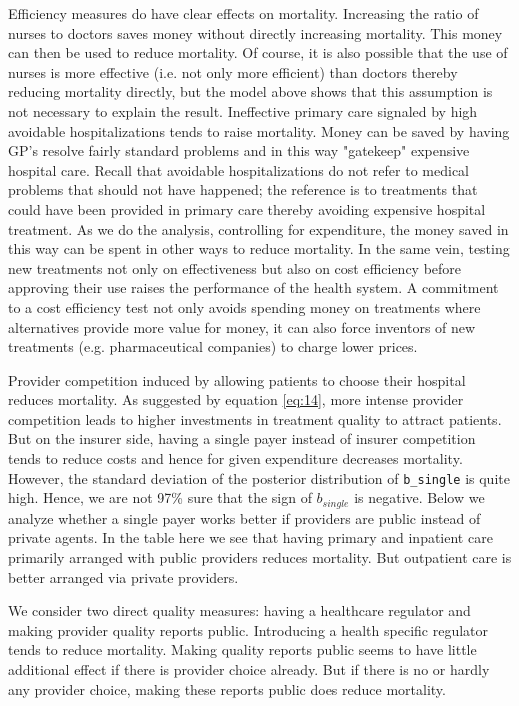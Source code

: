 \documentclass[12pt,english,a4paper]{article}
\begin{document}
Efficiency measures do have clear effects on mortality. Increasing the ratio of nurses to doctors saves money without directly increasing mortality. This money can then be used to reduce mortality. Of course, it is also possible that the use of nurses is more effective (i.e. not only more efficient) than doctors thereby reducing mortality directly, but the model above shows that this assumption is not necessary to explain the result. Ineffective primary care signaled by high avoidable hospitalizations tends to raise mortality. Money can be saved by having GP's resolve fairly standard problems and in this way "gatekeep" expensive hospital care. Recall that avoidable hospitalizations do not refer to medical problems that should not have happened; the reference is to treatments that could have been provided in primary care thereby avoiding expensive hospital treatment. As we do the analysis, controlling for expenditure, the money saved in this way can be spent in other ways to reduce mortality. In the same vein, testing new treatments not only on effectiveness but also on cost efficiency before approving their use raises the performance of the health system. A commitment to a cost efficiency test not only avoids spending money on treatments where alternatives provide more value for money, it can also force inventors of new treatments (e.g. pharmaceutical companies) to charge lower prices.

Provider competition induced by allowing patients to choose their hospital reduces mortality. As suggested by equation \eqref{eq:14}, more intense provider competition leads to higher investments in treatment quality to attract patients. But on the insurer side, having a single payer instead of insurer competition tends to reduce costs and hence for given expenditure decreases mortality. However, the standard deviation of the posterior distribution of \texttt{b\_single} is quite high. Hence, we are not 97\% sure that the sign of \(b_{single}\) is negative. Below we analyze whether a single payer works better if providers are public instead of private agents. In the table here we see that having primary and inpatient care primarily arranged with public providers reduces mortality. But outpatient care is better arranged via private providers.

We consider two direct quality measures: having a healthcare regulator and making provider quality reports public. Introducing a health specific regulator tends to reduce mortality. Making quality reports public seems to have little additional effect if there is provider choice already. But if there is no or hardly any provider choice, making these reports public does reduce mortality.
\end{document}

